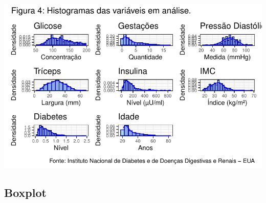 \documentclass[
  letterpaper,
  DIV=11,
  numbers=noendperiod]{scrartcl}
\begin{document}
\includegraphics{relatorio_lab1_files/figure-pdf/unnamed-chunk-8-1.pdf}

\hypertarget{boxplot}{%
\subsection{Boxplot}\label{boxplot}}
\end{document}

